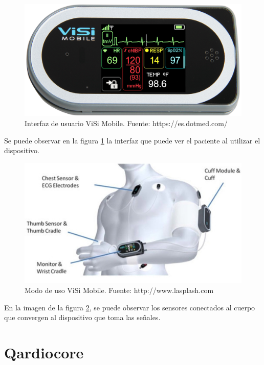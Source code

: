 \begin{figure}[H]
	\centering
	\includegraphics[scale=0.3]{figuras/estadoarte/visi/visi.jpg}
	\caption{Interfaz de usuario ViSi Mobile\textregistered. Fuente: https://es.dotmed.com/}
	\label{visi1}
\end{figure}

Se puede observar en la figura \ref{visi1} la interfaz que puede ver el paciente al utilizar el dispositivo.

\begin{figure}[H]
	\centering
	\includegraphics[scale=0.7]{figuras/estadoarte/visi/wear.jpg}
	\caption{Modo de uso ViSi Mobile\textregistered. Fuente: http://www.lasplash.com}
	\label{visi2}
\end{figure}

En la imagen de la figura \ref{visi2}, se puede observar los sensores conectados al cuerpo que convergen al dispositivo que toma las señales.

\section{Qardiocore\textregistered}

